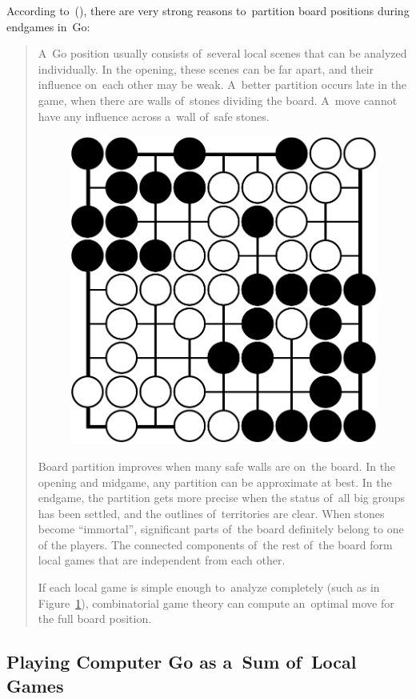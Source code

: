 According to~(\cite{Muller1995computer}), there are very strong reasons to~partition board positions during endgames in~Go:
\begin{quotation}
  A~Go position usually consists of~several local scenes that can be analyzed individually.
  In the opening, these scenes can be far apart, and their influence on~each other may be weak.
  A~better partition occurs late in the game, when there are walls of~stones dividing the board.
  A~move cannot have any influence across a~wall of~safe stones.

  \begin{figure}[H]
    \centering
    \includegraphics[width=.4\textwidth]{../img/late_endgame_Go_position_suited_for_exact_analysis.png}
    \label{fig:late-Go-endgame}
  \end{figure}

  Board partition improves when many safe walls are on~the board.
  In the opening and midgame, any partition can be approximate at best.
  In the endgame, the partition gets more precise when the status of~all big groups has been settled, and the outlines of~territories are clear.
  When stones become ``immortal'', significant parts of~the board definitely belong to one of the players.
  The connected components of~the rest of~the board form local games that are independent from each other.

  If each local game is simple enough to~analyze completely (such as in Figure~\ref{fig:late-Go-endgame}), combinatorial game theory can compute an~optimal move for the full board position.
\end{quotation}

\subsection{Playing Computer Go as a~Sum of~Local Games}

